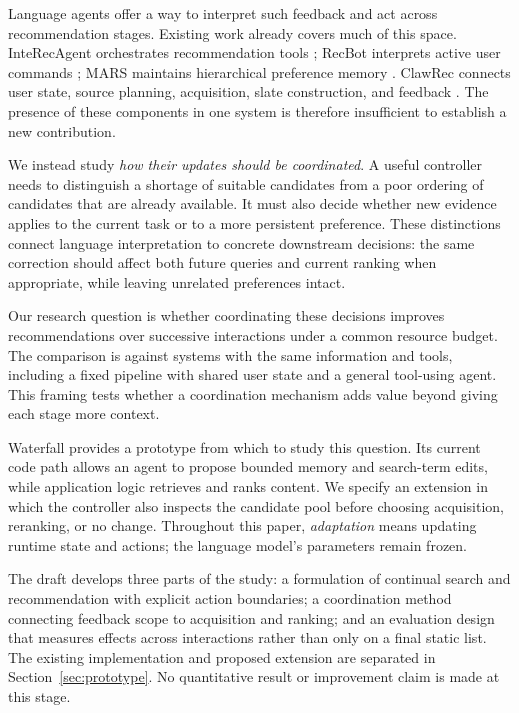 \documentclass[11pt]{article}
\begin{document}
Language agents offer a way to interpret such feedback and act across recommendation stages. Existing work already covers much of this space. InteRecAgent orchestrates recommendation tools \citep{huang2025interecagent}; RecBot interprets active user commands \citep{tang2026recbot}; MARS maintains hierarchical preference memory \citep{shen2026mars}. ClawRec connects user state, source planning, acquisition, slate construction, and feedback \citep{wu2026clawrec}. The presence of these components in one system is therefore insufficient to establish a new contribution.

We instead study \emph{how their updates should be coordinated}. A useful controller needs to distinguish a shortage of suitable candidates from a poor ordering of candidates that are already available. It must also decide whether new evidence applies to the current task or to a more persistent preference. These distinctions connect language interpretation to concrete downstream decisions: the same correction should affect both future queries and current ranking when appropriate, while leaving unrelated preferences intact.

Our research question is whether coordinating these decisions improves recommendations over successive interactions under a common resource budget. The comparison is against systems with the same information and tools, including a fixed pipeline with shared user state and a general tool-using agent. This framing tests whether a coordination mechanism adds value beyond giving each stage more context.

Waterfall provides a prototype from which to study this question. Its current code path allows an agent to propose bounded memory and search-term edits, while application logic retrieves and ranks content. We specify an extension in which the controller also inspects the candidate pool before choosing acquisition, reranking, or no change. Throughout this paper, \emph{adaptation} means updating runtime state and actions; the language model's parameters remain frozen.

The draft develops three parts of the study: a formulation of continual search and recommendation with explicit action boundaries; a coordination method connecting feedback scope to acquisition and ranking; and an evaluation design that measures effects across interactions rather than only on a final static list. The existing implementation and proposed extension are separated in Section~\ref{sec:prototype}. No quantitative result or improvement claim is made at this stage.
\end{document}
